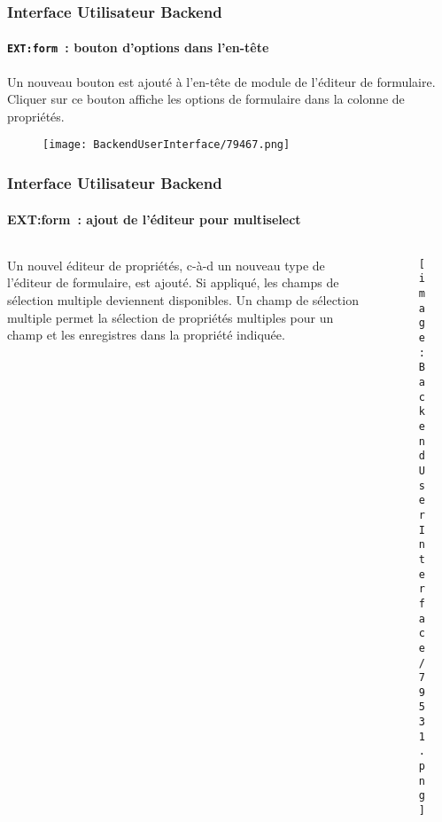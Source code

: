 \begin{frame}[fragile]
	\frametitle{Interface Utilisateur Backend}
	\framesubtitle{\texttt{EXT:form}~: bouton d'options dans l'en-tête}

	Un nouveau bouton est ajouté à l'en-tête de module de l'éditeur de formulaire.
	Cliquer sur ce bouton affiche les options de formulaire dans la colonne de propriétés.

	\begin{figure}\vspace{-0.2cm}
		\texttt{[image: BackendUserInterface/79467.png]}
	\end{figure}

\end{frame}

\begin{frame}[fragile]
	\frametitle{Interface Utilisateur Backend}
	\framesubtitle{{EXT:form}~: ajout de l'éditeur pour multiselect}

	\begin{columns}[T]
		\begin{column}{0.4\textwidth}
			Un nouvel éditeur de propriétés, c-à-d un nouveau type de l'éditeur de formulaire,
			est ajouté. Si appliqué, les champs de sélection multiple deviennent disponibles.
			Un champ de sélection multiple permet la sélection de propriétés multiples pour un
			champ et les enregistres dans la propriété indiquée.
		\end{column}

		\begin{column}{0.6\textwidth}
			\begin{figure}\vspace*{-0.6cm}
				\texttt{[image: BackendUserInterface/79531.png]}
			\end{figure}
		\end{column}
	\end{columns}

\end{frame}

